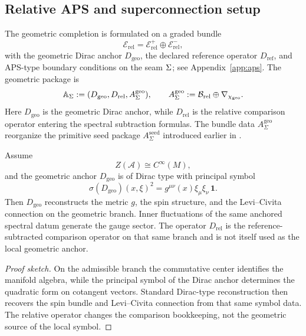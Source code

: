 \subsection{Relative APS and superconnection setup}

The geometric completion is formulated on a graded bundle
\[
\mathcal E_{\mathrm{rel}}=\mathcal E_{\mathrm{rel}}^+\oplus\mathcal E_{\mathrm{rel}}^-,
\]
with the geometric Dirac anchor $D_{\mathrm{geo}}$, the declared reference operator
$D_{\mathrm{ref}}$, and APS-type boundary conditions on the seam $\Sigma$; see
Appendix~\ref{app:aps}. The geometric package is
\[
\mathbb A_{\Sigma}:=(D_{\mathrm{geo}},D_{\mathrm{rel}},A_{\Sigma}^{\mathrm{geo}}),
\qquad
A_{\Sigma}^{\mathrm{geo}}:=\mathcal B_{\mathrm{rel}}\oplus\nabla_{\chi_{\mathrm{geo}}}.
\]
Here $D_{\mathrm{geo}}$ is the geometric Dirac anchor, while $D_{\mathrm{rel}}$ is the relative comparison operator entering the spectral subtraction formulas. The bundle data $A_{\Sigma}^{\mathrm{geo}}$ reorganize the primitive seed package $A_{\Sigma}^{\mathrm{seed}}$ introduced earlier in .
\begin{theorem}
\label{thm:geometric-reconstruction-anchor}
\label{thm:geometric-reconstruction-from-Dgeo}
\label{thm:relative-geometric-reconstruction}
Assume
\[
Z(\mathcal A)\cong C^\infty(M),
\]
and the geometric anchor $D_{\mathrm{geo}}$ is of Dirac type with principal symbol
\[
\sigma(D_{\mathrm{geo}})(x,\xi)^2
=
g^{\mu\nu}(x)\xi_\mu\xi_\nu\,\mathbf 1.
\]
Then $D_{\mathrm{geo}}$ reconstructs the metric $g$, the spin structure, and the
Levi--Civita connection on the geometric branch. Inner fluctuations of the same anchored
spectral datum generate the gauge sector.
The operator $D_{\mathrm{rel}}$ is the reference-subtracted comparison operator on that
same branch and is not itself used as the local geometric anchor.
\end{theorem}

\begin{proof}[Proof sketch]
On the admissible branch the commutative center identifies the manifold algebra, while the
principal symbol of the Dirac anchor determines the quadratic form on cotangent vectors.
Standard Dirac-type reconstruction then recovers the spin bundle and Levi--Civita connection
from that same symbol data. The relative operator changes the comparison bookkeeping, not the
geometric source of the local symbol.
\end{proof}

